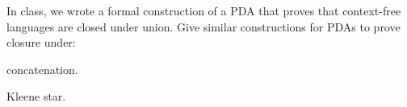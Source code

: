 \begin{problem}
  In class, we wrote a formal construction of a PDA that proves
  that context-free languages are closed under union.
  Give similar constructions for PDAs to prove closure under:
  \begin{enumalph}
    \item concatenation.
    \item Kleene star.
  \end{enumalph}
\end{problem}
